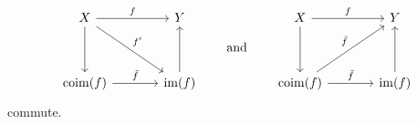 \begin{lemma}
\begin{enumerate}
\begin{equation}
        \label{compatibility of induced morphisms}
        \begin{tikzcd}[column sep = large, row sep = huge]
            X
            \arrow{r}[above]{f}
            \arrow{dr}[above right]{f'}
            \arrow{d}
          & Y
          \\
            \coim(f)
            \arrow{r}[above]{\tilde{f}}
          & \im(f)
            \arrow{u}
        \end{tikzcd}
        \qquad\text{and}\qquad
        \begin{tikzcd}[column sep = large, row sep = huge]
            X
            \arrow{r}[above]{f}
            \arrow{d}
          & Y
          \\
            \coim(f)
            \arrow{r}[above]{\tilde{f}}
            \arrow{ur}[above left]{\bar{f}}
          & \im(f)
            \arrow{u}
        \end{tikzcd}
      \end{equation}
      commute.
  \end{enumerate}
\end{lemma}


